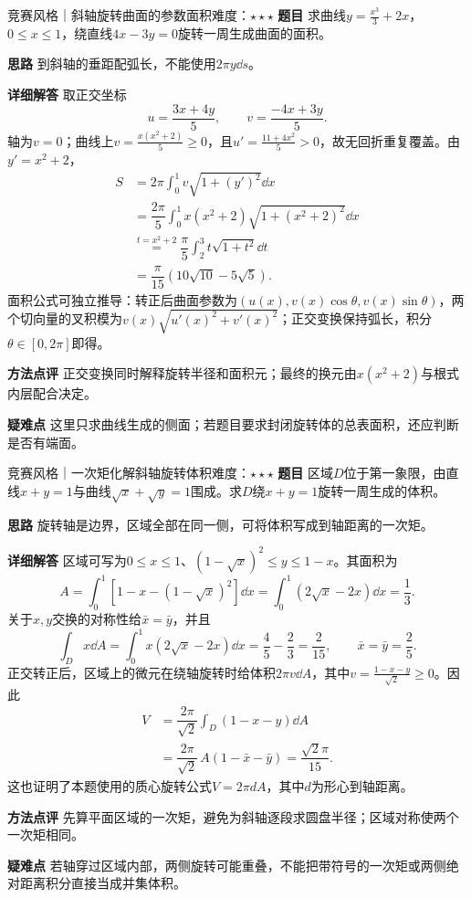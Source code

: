 \begin{example}{竞赛风格｜斜轴旋转曲面的参数面积}{难度：$\star\star\star$}\label{ci:ex:obliquearea}
\textbf{题目} 求曲线$y=\frac{x^3}{3}+2x$，$0\le x\le1$，绕直线$4x-3y=0$旋转一周生成曲面的面积。\par
\textbf{思路} 到斜轴的垂距配弧长，不能使用$2\pi y\dd s$。\par
\textbf{详细解答} 取正交坐标
\[
 u=\dfrac{3x+4y}5,\qquad v=\dfrac{-4x+3y}5.
\]
轴为$v=0$；曲线上$v=\frac{x(x^2+2)}{5}\ge0$，且$u'=\frac{11+4x^2}{5}>0$，故无回折重复覆盖。由$y'=x^2+2$，
\begin{align*}
 S&=2\pi\int_0^1v\sqrt{1+(y')^2}\dd x\\
 &=\dfrac{2\pi}5\int_0^1x(x^2+2)\sqrt{1+(x^2+2)^2}\dd x\\
 &\overset{t=x^2+2}{=}\dfrac\pi5\int_2^3t\sqrt{1+t^2}\dd t\\
 &=\dfrac\pi{15}\left(10\sqrt{10}-5\sqrt5\right).
\end{align*}
面积公式可独立推导：转正后曲面参数为$(u(x),v(x)\cos\theta,v(x)\sin\theta)$，两个切向量的叉积模为$v(x)\sqrt{u'(x)^2+v'(x)^2}$；正交变换保持弧长，积分$\theta\in[0,2\pi]$即得。\par
\textbf{方法点评} 正交变换同时解释旋转半径和面积元；最终的换元由$x(x^2+2)$与根式内层配合决定。\par
\textbf{疑难点} 这里只求曲线生成的侧面；若题目要求封闭旋转体的总表面积，还应判断是否有端面。
\end{example}
\begin{example}{竞赛风格｜一次矩化解斜轴旋转体积}{难度：$\star\star\star$}\label{ci:ex:pappus}
\textbf{题目} 区域$D$位于第一象限，由直线$x+y=1$与曲线$\sqrt x+\sqrt y=1$围成。求$D$绕$x+y=1$旋转一周生成的体积。\par
\textbf{思路} 旋转轴是边界，区域全部在同一侧，可将体积写成到轴距离的一次矩。\par
\textbf{详细解答} 区域可写为$0\le x\le1$、$(1-\sqrt x)^2\le y\le1-x$。其面积为
\[
 A=\int_0^1[1-x-(1-\sqrt x)^2]\dd x
 =\int_0^1(2\sqrt x-2x)\dd x=\dfrac13.
\]
关于$x,y$交换的对称性给$\bar x=\bar y$，并且
\[
 \int_Dx\dd A
 =\int_0^1x(2\sqrt x-2x)\dd x
 =\dfrac45-\dfrac23=\dfrac2{15},
 \qquad \bar x=\bar y=\dfrac25.
\]
正交转正后，区域上的微元在绕轴旋转时给体积$2\pi v\dd A$，其中$v=\frac{1-x-y}{\sqrt2}\ge0$。因此
\begin{align*}
 V&=\dfrac{2\pi}{\sqrt2}\int_D(1-x-y)\dd A\\
 &=\dfrac{2\pi}{\sqrt2}\,A(1-\bar x-\bar y)
 =\dfrac{\sqrt2\pi}{15}.
\end{align*}
这也证明了本题使用的质心旋转公式$V=2\pi dA$，其中$d$为形心到轴距离。\par
\textbf{方法点评} 先算平面区域的一次矩，避免为斜轴逐段求圆盘半径；区域对称使两个一次矩相同。\par
\textbf{疑难点} 若轴穿过区域内部，两侧旋转可能重叠，不能把带符号的一次矩或两侧绝对距离积分直接当成并集体积。
\end{example}
